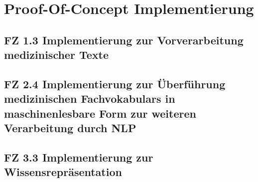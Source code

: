 \chapter{Proof-Of-Concept Implementierung}
\label{ch:implementierung}


\section{FZ 1.3 Implementierung zur Vorverarbeitung medizinischer Texte}
\label{sec:FZ1.3} 

\section{FZ 2.4 Implementierung zur Überführung medizinischen Fachvokabulars in maschinenlesbare Form zur weiteren Verarbeitung durch NLP}
\label{sec:FZ2.4} 

\section{FZ 3.3 Implementierung zur Wissensrepräsentation}
\label{sec:FZ3.3} 

